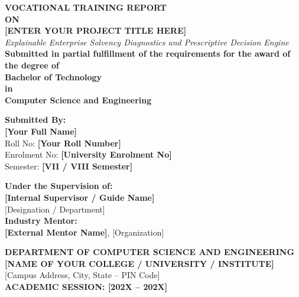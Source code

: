\documentclass[11pt, a4paper]{article}
\begin{document}
\begin{titlepage}
    \centering
    \vspace*{1cm}
    
    {\Huge \textbf{VOCATIONAL TRAINING REPORT}}\\[0.4cm]
    {\large \textbf{ON}}\\[0.6cm]
    
    {\huge \textbf{[ENTER YOUR PROJECT TITLE HERE]}}\\[0.3cm]
    {\Large \textit{Explainable Enterprise Solvency Diagnostics and Prescriptive Decision Engine}}\\[1.5cm]
    
    \textbf{Submitted in partial fulfillment of the requirements for the award of the degree of}\\[0.3cm]
    {\Large \textbf{Bachelor of Technology}}\\[0.2cm]
    {\large \textbf{in}}\\[0.2cm]
    {\Large \textbf{Computer Science and Engineering}}\\[2cm]
    
    \begin{minipage}{0.45\textwidth}
        \textbf{Submitted By:}\\[0.2cm]
        \textbf{[Your Full Name]}\\[0.1cm]
        Roll No: \textbf{[Your Roll Number]}\\[0.1cm]
        Enrolment No: \textbf{[University Enrolment No]}\\[0.1cm]
        Semester: \textbf{[VII / VIII Semester]}
    \end{minipage}
    \hfill
    \begin{minipage}{0.45\textwidth}
        \begin{flushright}
            \textbf{Under the Supervision of:}\\[0.2cm]
            \textbf{[Internal Supervisor / Guide Name]}\\[0.1cm]
            [Designation / Department]\\[0.1cm]
            \textbf{Industry Mentor:}\\[0.1cm]
            \textbf{[External Mentor Name]}, [Organization]
        \end{flushright}
    \end{minipage}
    
    \vfill
    
    \textbf{DEPARTMENT OF COMPUTER SCIENCE AND ENGINEERING}\\[0.2cm]
    {\large \textbf{[NAME OF YOUR COLLEGE / UNIVERSITY / INSTITUTE]}}\\[0.2cm]
    {[Campus Address, City, State -- PIN Code]}\\[0.4cm]
    \textbf{ACADEMIC SESSION: [202X -- 202X]}
\end{titlepage}
\end{document}
